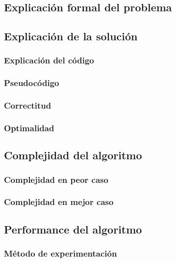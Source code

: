 \subsection{Explicación formal del problema}

\subsection{Explicación de la solución}

\subsubsection{Explicación del código}

\subsubsection{Pseudocódigo}

\subsubsection{Correctitud}

\subsubsection{Optimalidad}

\subsection{Complejidad del algoritmo}

\subsubsection{Complejidad en peor caso}

\subsubsection{Complejidad en mejor caso}

\subsection{Performance del algoritmo}

\subsubsection{M\'etodo de experimentación}